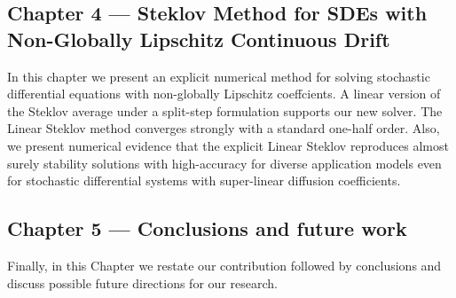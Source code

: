 	\subsection*{Chapter 4 --- Steklov Method for SDEs with Non-Globally Lipschitz Continuous Drift}
	
			In this chapter we present an explicit numerical method for solving stochastic differential equations with
		non-globally Lipschitz coeffcients. A linear version of the Steklov average under a split-step formulation 
		supports our new solver. The Linear Steklov method converges strongly with a standard
		one-half order. Also, we present numerical evidence that the explicit Linear Steklov reproduces almost surely 
		stability solutions with high-accuracy for diverse application models even
		for stochastic differential systems with super-linear diffusion coefficients.
		
	
	\subsection*{Chapter 5 --- Conclusions and future work}
	
			Finally, in this Chapter  we restate our contribution followed by conclusions and discuss 
		possible future directions for our research.